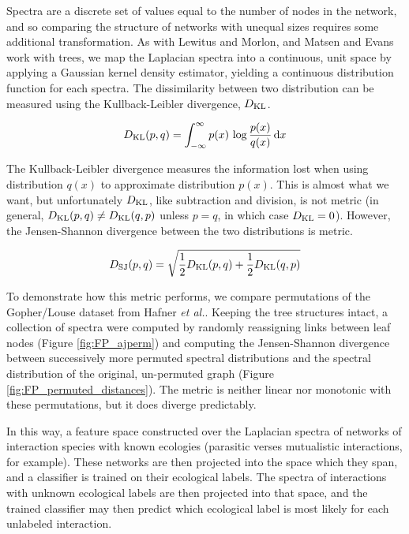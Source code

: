 Spectra are a discrete set of values equal to the number of nodes in the network, and so comparing the structure of networks with unequal sizes requires some additional transformation. As with Lewitus and Morlon, and Matsen and Evans \cite{lewitus2015characterizing, matsen2012ubiquity} work with trees, we map the Laplacian spectra into a continuous, unit space by applying a Gaussian kernel density estimator, yielding a continuous distribution function for each spectra. The dissimilarity between two distribution can be measured using the Kullback-Leibler divergence, $D_{\rm KL}$. 

\begin{equation}
    D_{\rm KL}( p, q ) = \int_{-\infty}^\infty p(x) \, \log\frac{p(x)}{q(x)} \, {\rm d}x
\end{equation}

\noindent The Kullback-Leibler divergence measures the information lost when using distribution $q(x)$ to approximate distribution $p(x)$. This is almost what we want, but unfortunately $D_{\rm KL}$, like subtraction and division, is not metric (in general, $D_{\rm KL}(p,q) \neq D_{\rm KL}(q,p)$ unless $p=q$, in which case $D_{\rm KL}=0$). However, the Jensen-Shannon divergence between the two distributions is metric.

\begin{equation}
    D_{\rm SJ}( p, q ) = \sqrt{ \frac{1}{2} D_{\rm KL}( p, q ) + \frac{1}{2} D_{\rm KL}( q, p ) }
\end{equation}

\noindent To demonstrate how this metric performs, we compare permutations of the Gopher/Louse dataset from Hafner {\em et al.}. Keeping the tree structures intact, a collection of spectra were computed by randomly reassigning links between leaf nodes (Figure \ref{fig:FP_ajperm}) and computing the Jensen-Shannon divergence between successively more permuted spectral distributions and the spectral distribution of the original, un-permuted graph (Figure \ref{fig:FP_permuted_distances}). The metric is neither linear nor monotonic with these permutations, but it does diverge predictably. 







In this way, a feature space constructed over the Laplacian spectra of networks of interaction species with known ecologies (parasitic verses mutualistic interactions, for example). These networks are then projected into the space which they span, and a classifier is trained on their ecological labels. The spectra of interactions with unknown ecological labels are then projected into that space, and the trained classifier may then predict which ecological label is most likely for each unlabeled interaction.


